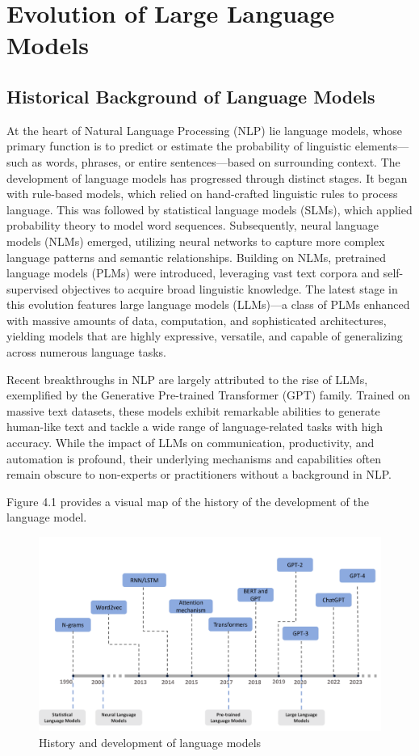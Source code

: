 \chapter{Evolution of Large Language Models}

\section{Historical Background of Language Models}

At the heart of Natural Language Processing (NLP) lie language models, whose primary function is to predict or estimate the probability of linguistic elements—such as words, phrases, or entire sentences—based on surrounding context. The development of language models has progressed through distinct stages. It began with rule-based models, which relied on hand-crafted linguistic rules to process language. This was followed by statistical language models (SLMs), which applied probability theory to model word sequences. Subsequently, neural language models (NLMs) emerged, utilizing neural networks to capture more complex language patterns and semantic relationships. Building on NLMs, pretrained language models (PLMs) were introduced, leveraging vast text corpora and self-supervised objectives to acquire broad linguistic knowledge. The latest stage in this evolution features large language models (LLMs)—a class of PLMs enhanced with massive amounts of data, computation, and sophisticated architectures, yielding models that are highly expressive, versatile, and capable of generalizing across numerous language tasks.

Recent breakthroughs in NLP are largely attributed to the rise of LLMs, exemplified by the Generative Pre-trained Transformer (GPT) family. Trained on massive text datasets, these models exhibit remarkable abilities to generate human-like text and tackle a wide range of language-related tasks with high accuracy. While the impact of LLMs on communication, productivity, and automation is profound, their underlying mechanisms and capabilities often remain obscure to non-experts or practitioners without a background in NLP.

Figure 4.1 provides a visual map of the history of the development of the language model.

\begin{figure}[h]
    \centering
    \includegraphics[width=0.8\linewidth]{img/chap04/historyllm.png}
    \caption{History and development of language models}
    \label{fig:historyllm}
\end{figure}

